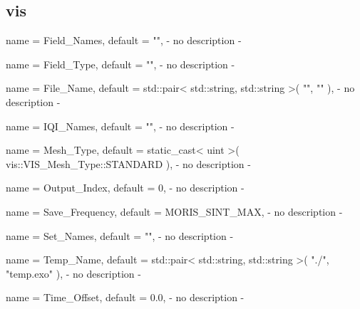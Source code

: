 \subsection{vis}

\begin{parameter}{
    name    = {Field_Names},
    default = {""},
}
- no description -
\end{parameter}

\begin{parameter}{
    name    = {Field_Type},
    default = {""},
}
- no description -
\end{parameter}

\begin{parameter}{
    name    = {File_Name},
    default = {std::pair< std::string, std::string >( "", "" )},
}
- no description -
\end{parameter}

\begin{parameter}{
    name    = {IQI_Names},
    default = {""},
}
- no description -
\end{parameter}

\begin{parameter}{
    name    = {Mesh_Type},
    default = {static_cast< uint >( vis::VIS_Mesh_Type::STANDARD )},
}
- no description -
\end{parameter}

\begin{parameter}{
    name    = {Output_Index},
    default = {0},
}
- no description -
\end{parameter}

\begin{parameter}{
    name    = {Save_Frequency},
    default = {MORIS_SINT_MAX},
}
- no description -
\end{parameter}

\begin{parameter}{
    name    = {Set_Names},
    default = {""},
}
- no description -
\end{parameter}

\begin{parameter}{
    name    = {Temp_Name},
    default = {std::pair< std::string, std::string >( "./", "temp.exo" )},
}
- no description -
\end{parameter}

\begin{parameter}{
    name    = {Time_Offset},
    default = {0.0},
}
- no description -
\end{parameter}

